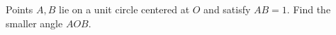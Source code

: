 Points $ A,B $ lie on a unit circle centered at $ O $ and satisfy $ AB=1 $. Find the smaller angle $ AOB $.
